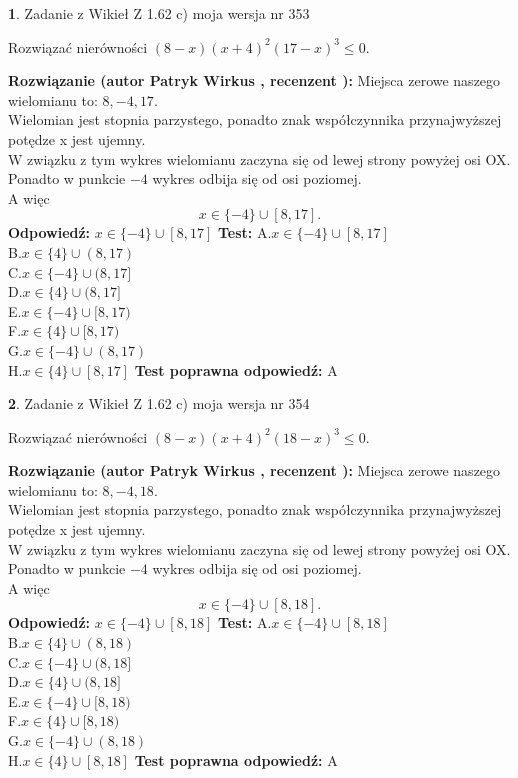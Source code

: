 \documentclass[12pt, a4paper]{article}
\theoremstyle{definition} %
\newtheorem{zad}{}
\newcommand{\zadStart}[1]{\begin{zad}#1\newline}
\newcommand{\zadStop}{\end{zad}}
\newcommand{\rozwStart}[2]{\noindent \textbf{Rozwiązanie (autor #1 , recenzent #2): }\newline}
\newcommand{\rozwStop}{\newline}
\newcommand{\odpStart}{\noindent \textbf{Odpowiedź:}\newline}
\newcommand{\odpStop}{\newline}
\newcommand{\testStart}{\noindent \textbf{Test:}\newline}
\newcommand{\testStop}{\newline}
\newcommand{\kluczStart}{\noindent \textbf{Test poprawna odpowiedź:}\newline}
\newcommand{\kluczStop}{\newline}
\begin{document}
\zadStart{Zadanie z Wikieł Z 1.62 c) moja wersja nr 353}

Rozwiązać nierówności $(8-x)(x+4)^{2}(17-x)^{3}\le0$.
\zadStop
\rozwStart{Patryk Wirkus}{}
Miejsca zerowe naszego wielomianu to: $8, -4, 17$.\\
Wielomian jest stopnia parzystego, ponadto znak współczynnika przy\linebreak najwyższej potędze x jest ujemny.\\ W związku z tym wykres wielomianu zaczyna się od lewej strony powyżej osi OX.\\
Ponadto w punkcie $-4$ wykres odbija się od osi poziomej.\\
A więc $$x \in \{-4\} \cup [8,17].$$
\rozwStop
\odpStart
$x \in \{-4\} \cup [8,17]$
\odpStop
\testStart
A.$x \in \{-4\} \cup [8,17]$\\
B.$x \in \{4\} \cup (8,17)$\\
C.$x \in \{-4\} \cup (8,17]$\\
D.$x \in \{4\} \cup (8,17]$\\
E.$x \in \{-4\} \cup [8,17)$\\
F.$x \in \{4\} \cup [8,17)$\\
G.$x \in \{-4\} \cup (8,17)$\\
H.$x \in \{4\} \cup [8,17]$
\testStop
\kluczStart
A
\kluczStop



\zadStart{Zadanie z Wikieł Z 1.62 c) moja wersja nr 354}

Rozwiązać nierówności $(8-x)(x+4)^{2}(18-x)^{3}\le0$.
\zadStop
\rozwStart{Patryk Wirkus}{}
Miejsca zerowe naszego wielomianu to: $8, -4, 18$.\\
Wielomian jest stopnia parzystego, ponadto znak współczynnika przy\linebreak najwyższej potędze x jest ujemny.\\ W związku z tym wykres wielomianu zaczyna się od lewej strony powyżej osi OX.\\
Ponadto w punkcie $-4$ wykres odbija się od osi poziomej.\\
A więc $$x \in \{-4\} \cup [8,18].$$
\rozwStop
\odpStart
$x \in \{-4\} \cup [8,18]$
\odpStop
\testStart
A.$x \in \{-4\} \cup [8,18]$\\
B.$x \in \{4\} \cup (8,18)$\\
C.$x \in \{-4\} \cup (8,18]$\\
D.$x \in \{4\} \cup (8,18]$\\
E.$x \in \{-4\} \cup [8,18)$\\
F.$x \in \{4\} \cup [8,18)$\\
G.$x \in \{-4\} \cup (8,18)$\\
H.$x \in \{4\} \cup [8,18]$
\testStop
\kluczStart
A
\kluczStop
\end{document}
